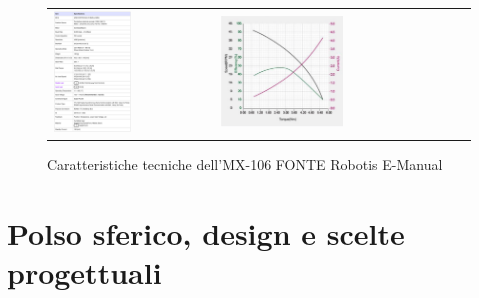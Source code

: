 \documentclass[%
corpo=11pt,
twoside,
 stile=classica,
oldstyle,
greek,%
]{toptesi}
\begin{document}
	\begin{figure}
		\centering
		\begin{tabular}{ll}
			\includegraphics[width=0.5\textwidth]{image/mx160data.png}
			&
			\includegraphics[width=0.5\textwidth]{image/mx160figure.png}
		\end{tabular}
		\caption{Caratteristiche tecniche dell'MX-106 FONTE Robotis E-Manual \cite{mx106}}
		\label{fig:MX160data}
	\end{figure}

		
\chapter{Polso sferico, design e scelte progettuali}
\end{document}
